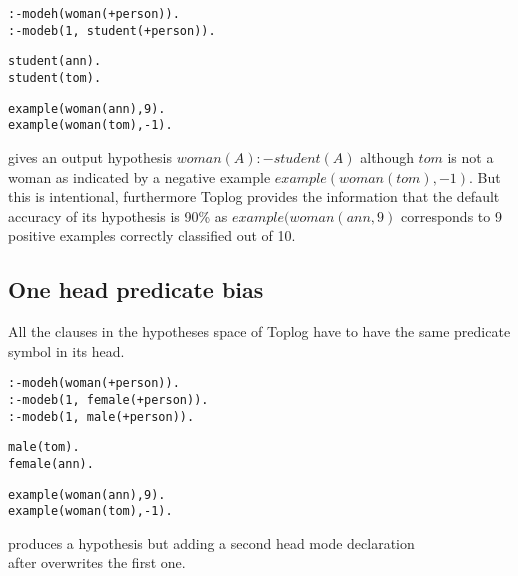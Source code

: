 \begin{minipage}[t]{.40\textwidth}
\begin{lstlisting}
:-modeh(woman(+person)).
:-modeb(1, student(+person)).
\end{lstlisting}
\end{minipage}
\begin{minipage}[t]{.20\textwidth}
\begin{lstlisting}
student(ann).
student(tom).
\end{lstlisting}
\end{minipage}
\begin{minipage}[t]{.20\textwidth}
\begin{lstlisting}
example(woman(ann),9).
example(woman(tom),-1).
\end{lstlisting}
\end{minipage}


gives an output hypothesis $woman(A) :- student(A)$ although $tom$ is not a woman as indicated by a negative example $example(woman(tom),-1)$.
But this is intentional, furthermore Toplog provides the information that the default accuracy of its hypothesis is 90\% as $example(woman(ann,9)$ corresponds to 9 positive examples correctly classified out of 10.

\subsection{One head predicate bias}
All the clauses in the hypotheses space of Toplog have to have the same predicate symbol in its head.

\begin{minipage}[t]{.40\textwidth}
\begin{lstlisting}
:-modeh(woman(+person)).
:-modeb(1, female(+person)).
:-modeb(1, male(+person)).
\end{lstlisting}
\end{minipage}
\begin{minipage}[t]{.20\textwidth}
\begin{lstlisting}
male(tom).
female(ann).
\end{lstlisting}
\end{minipage}
\begin{minipage}[t]{.20\textwidth}
\begin{lstlisting}
example(woman(ann),9).
example(woman(tom),-1).
\end{lstlisting}
\end{minipage}

produces a hypothesis  but adding a second
head mode declaration \\
 after  overwrites the first one.

